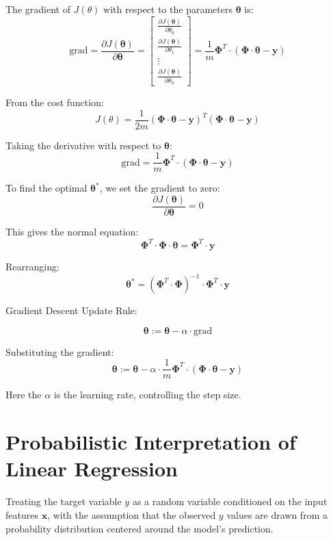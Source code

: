 The gradient of \(J(\theta)\) with respect to the parameters \(\boldsymbol{\theta}\) is:
\[
\text{grad} = \frac{\partial J(\boldsymbol{\theta})}{\partial \boldsymbol{\theta}} =
\begin{bmatrix}
\frac{\partial J(\boldsymbol{\theta})}{\partial \theta_0} \\
\frac{\partial J(\boldsymbol{\theta})}{\partial \theta_1} \\
\vdots \\
\frac{\partial J(\boldsymbol{\theta})}{\partial \theta_n}
\end{bmatrix}
= \frac{1}{m} \boldsymbol{\Phi}^T \cdot (\boldsymbol{\Phi} \cdot \boldsymbol{\theta} - \mathbf{y})
\]



From the cost function:
\[
J(\theta) = \frac{1}{2m} (\boldsymbol{\Phi} \cdot \boldsymbol{\theta} - \mathbf{y})^T (\boldsymbol{\Phi} \cdot \boldsymbol{\theta} - \mathbf{y})
\]

Taking the derivative with respect to \(\boldsymbol{\theta}\):
\[
\text{grad} = \frac{1}{m} \boldsymbol{\Phi}^T \cdot (\boldsymbol{\Phi} \cdot \boldsymbol{\theta} - \mathbf{y})
\]

To find the optimal \(\boldsymbol{\theta}^*\), we set the gradient to zero:
\[
\frac{\partial J(\boldsymbol{\theta})}{\partial \boldsymbol{\theta}} = 0
\]

This gives the normal equation:
\[
\boldsymbol{\Phi}^T \cdot \boldsymbol{\Phi} \cdot \boldsymbol{\theta} = \boldsymbol{\Phi}^T \cdot \mathbf{y}
\]

Rearranging:
\[
\boldsymbol{\theta}^* = (\boldsymbol{\Phi}^T \cdot \boldsymbol{\Phi})^{-1} \cdot \boldsymbol{\Phi}^T \cdot \mathbf{y}
\]


Gradient Descent Update Rule:

\[
\boldsymbol{\theta} := \boldsymbol{\theta} - \alpha \cdot \text{grad}
\]

Substituting the gradient:
\[
\boldsymbol{\theta} := \boldsymbol{\theta} - \alpha \cdot \frac{1}{m} \boldsymbol{\Phi}^T \cdot (\boldsymbol{\Phi} \cdot
\boldsymbol{\theta} - \mathbf{y})
\]

Here the \(\alpha\) is the learning rate, controlling the step size.

\section{Probabilistic Interpretation of Linear Regression}

Treating the target variable \(y\) as a random variable conditioned on the input features \(\mathbf{x}\), with the
assumption that the observed \(y\) values are drawn from a probability distribution centered around the model's
prediction.

